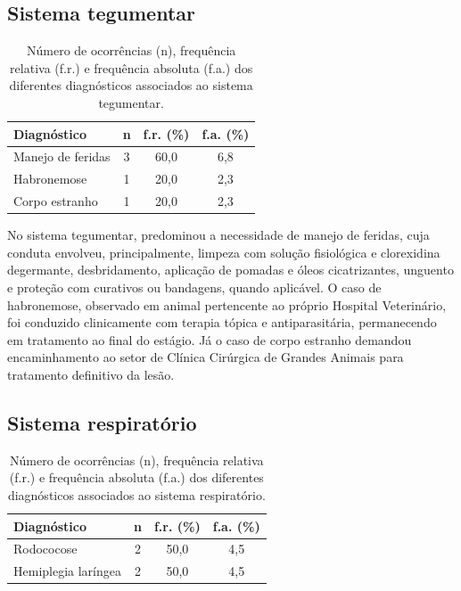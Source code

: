 \subsection{Sistema tegumentar}
\label{subsec:tegumentar}

\begin{table}[htb]
  \centering
  \caption{Número de ocorrências (n), frequência relativa (f.r.) e frequência absoluta (f.a.) dos diferentes diagnósticos associados ao sistema tegumentar.}
  \label{tab:tegumentar}
  \begin{tabular}{lccc}
    \toprule
    \textbf{Diagnóstico} & \textbf{n} & \textbf{f.r. (\%)} & \textbf{f.a. (\%)} \\
    \midrule
    Manejo de feridas & 3 & 60,0 & 6,8 \\
    Habronemose       & 1 & 20,0 & 2,3 \\
    Corpo estranho    & 1 & 20,0 & 2,3 \\
    \bottomrule
  \end{tabular}
\end{table}

No sistema tegumentar, predominou a necessidade de manejo de feridas,
cuja conduta envolveu, principalmente, limpeza com solução fisiológica e
clorexidina degermante, desbridamento, aplicação de pomadas e óleos
cicatrizantes, unguento e proteção com curativos ou bandagens, quando
aplicável. O caso de habronemose, observado em animal pertencente ao
próprio Hospital Veterinário, foi conduzido clinicamente com terapia
tópica e antiparasitária, permanecendo em tratamento ao final do
estágio. Já o caso de corpo estranho demandou encaminhamento ao setor de
Clínica Cirúrgica de Grandes Animais para tratamento definitivo da
lesão.

\subsection{Sistema respiratório}
\label{subsec:respiratorio}

\begin{table}[htb]
  \centering
  \caption{Número de ocorrências (n), frequência relativa (f.r.) e frequência absoluta (f.a.) dos diferentes diagnósticos associados ao sistema respiratório.}
  \label{tab:respiratorio}
  \begin{tabular}{lccc}
    \toprule
    \textbf{Diagnóstico} & \textbf{n} & \textbf{f.r. (\%)} & \textbf{f.a. (\%)} \\
    \midrule
    Rodococose        & 2 & 50,0 & 4,5 \\
    Hemiplegia laríngea & 2 & 50,0 & 4,5 \\
    \bottomrule
  \end{tabular}
\end{table}

